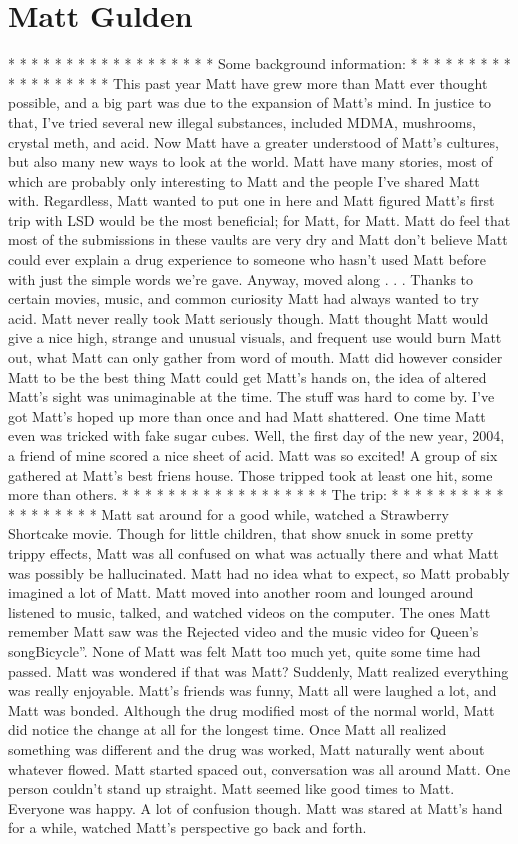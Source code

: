 \documentclass[12pt]{book}
\begin{document}
\chapter{Matt Gulden}

* * * * * * * * * * * * * * * * * * Some background information: * * * * * * * * * * * * * * * * * * This past year Matt have grew more than Matt ever thought possible, and a big part was due to the expansion of Matt's mind. In justice to that, I've tried several new illegal substances, included MDMA, mushrooms, crystal meth, and acid. Now Matt have a greater understood of Matt's cultures, but also many new ways to look at the world. Matt have many stories, most of which are probably only interesting to Matt and the people I've shared Matt with. Regardless, Matt wanted to put one in here and Matt figured Matt's first trip with LSD would be the most beneficial; for Matt, for Matt. Matt do feel that most of the submissions in these vaults are very dry and Matt don't believe Matt could ever explain a drug experience to someone who hasn't used Matt before with just the simple words we're gave. Anyway, moved along . . .  Thanks to certain movies, music, and common curiosity Matt had always wanted to try acid. Matt never really took Matt seriously though. Matt thought Matt would give a nice high, strange and unusual visuals, and frequent use would burn Matt out, what Matt can only gather from word of mouth. Matt did however consider Matt to be the best thing Matt could get Matt's hands on, the idea of altered Matt's sight was unimaginable at the time. The stuff was hard to come by. I've got Matt's hoped up more than once and had Matt shattered. One time Matt even was tricked with fake sugar cubes. Well, the first day of the new year, 2004, a friend of mine scored a nice sheet of acid. Matt was so excited! A group of six gathered at Matt's best friens house. Those tripped took at least one hit, some more than others. * * * * * * * * * * * * * * * * * * The trip: * * * * * * * * * * * * * * * * * * Matt sat around for a good while, watched a Strawberry Shortcake movie. Though for little children, that show snuck in some pretty trippy effects, Matt was all confused on what was actually there and what Matt was possibly be hallucinated. Matt had no idea what to expect, so Matt probably imagined a lot of Matt. Matt moved into another room and lounged around listened to music, talked, and watched videos on the computer. The ones Matt remember Matt saw was the Rejected video and the music video for Queen's songBicycle''. None of Matt was felt Matt too much yet, quite some time had passed. Matt was wondered if that was Matt? Suddenly, Matt realized everything was really enjoyable. Matt's friends was funny, Matt all were laughed a lot, and Matt was bonded. Although the drug modified most of the normal world, Matt did notice the change at all for the longest time. Once Matt all realized something was different and the drug was worked, Matt naturally went about whatever flowed. Matt started spaced out, conversation was all around Matt. One person couldn't stand up straight. Matt seemed like good times to Matt. Everyone was happy. A lot of confusion though. Matt was stared at Matt's hand for a while, watched Matt's perspective go back and forth. 
\end{document}
